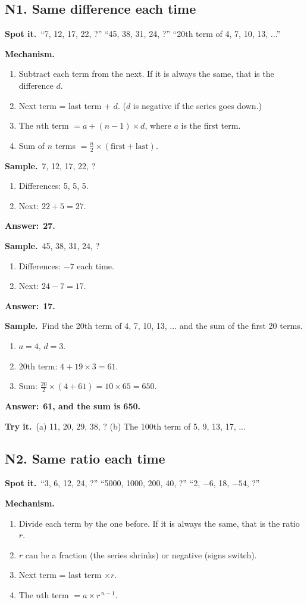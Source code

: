 \documentclass[11pt,a4paper]{article}
\let\oldsubsection\subsection
\renewcommand{\subsection}{\needspace{9\baselineskip}\oldsubsection}
\newcommand{\spot}{\textbf{\color{ember}Spot it.}\ }
\newcommand{\mech}{\textbf{\color{ember}Mechanism.}\ }
\newif\ifkeepsamp
\newcommand{\ans}[1]{\par\nopagebreak\noindent\textbf{\color{ember}Answer:}\ \textbf{#1}\par}
\newcommand{\samp}{\ifkeepsamp\needspace{4\baselineskip}\fi\textbf{\color{ember}Sample.}\ }
\newcommand{\tryit}[1]{\textbf{\color{ember}Try it.}\ #1}
\begin{document}
\subsection{N1. Same difference each time}
\spot ``7, 12, 17, 22, ?'' ``45, 38, 31, 24, ?'' ``20th term of 4, 7, 10, 13, ...''

\mech
\begin{enumerate}
\item Subtract each term from the next. If it is always the same, that is the difference $d$.
\item Next term = last term + $d$. ($d$ is negative if the series goes down.)
\item The $n$th term $= a + (n - 1) \times d$, where $a$ is the first term.
\item Sum of $n$ terms $= \tfrac{n}{2} \times (\text{first} + \text{last})$.
\end{enumerate}

\samp 7, 12, 17, 22, ?
\begin{enumerate}
\item Differences: 5, 5, 5.
\item Next: $22 + 5 = 27$.
\end{enumerate}
\ans{27.}

\samp 45, 38, 31, 24, ?
\begin{enumerate}
\item Differences: $-7$ each time.
\item Next: $24 - 7 = 17$.
\end{enumerate}
\ans{17.}

\samp Find the 20th term of 4, 7, 10, 13, ... and the sum of the first 20 terms.
\begin{enumerate}
\item $a = 4$, $d = 3$.
\item 20th term: $4 + 19 \times 3 = 61$.
\item Sum: $\tfrac{20}{2} \times (4 + 61) = 10 \times 65 = 650$.
\end{enumerate}
\ans{61, and the sum is 650.}

\tryit (a) 11, 20, 29, 38, ? (b) The 100th term of 5, 9, 13, 17, ...

\subsection{N2. Same ratio each time}
\spot ``3, 6, 12, 24, ?'' ``5000, 1000, 200, 40, ?'' ``2, $-6$, 18, $-54$, ?''

\mech
\begin{enumerate}
\item Divide each term by the one before. If it is always the same, that is the ratio $r$.
\item $r$ can be a fraction (the series shrinks) or negative (signs switch).
\item Next term = last term $\times r$.
\item The $n$th term $= a \times r^{\,n-1}$.
\end{enumerate}
\end{document}
